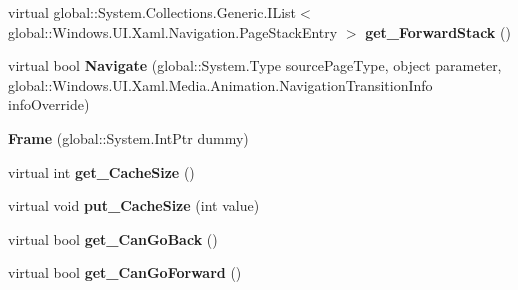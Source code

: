 \begin{DoxyCompactItemize}
\item 
\mbox{\label{class_windows_1_1_u_i_1_1_xaml_1_1_controls_1_1_frame_ae329d75ad7803db9b56a1087833db051}} 
virtual global\+::\+System.\+Collections.\+Generic.\+I\+List$<$ global\+::\+Windows.\+U\+I.\+Xaml.\+Navigation.\+Page\+Stack\+Entry $>$ {\bfseries get\+\_\+\+Forward\+Stack} ()
\item 
\mbox{\label{class_windows_1_1_u_i_1_1_xaml_1_1_controls_1_1_frame_ad618ba9d883d20cb4fe2b759803359e9}} 
virtual bool {\bfseries Navigate} (global\+::\+System.\+Type source\+Page\+Type, object parameter, global\+::\+Windows.\+U\+I.\+Xaml.\+Media.\+Animation.\+Navigation\+Transition\+Info info\+Override)
\item 
\mbox{\label{class_windows_1_1_u_i_1_1_xaml_1_1_controls_1_1_frame_a84fab9df3b200274d2539149011dfb10}} 
{\bfseries Frame} (global\+::\+System.\+Int\+Ptr dummy)
\item 
\mbox{\label{class_windows_1_1_u_i_1_1_xaml_1_1_controls_1_1_frame_a4feacaac243c53e320ffcf6ceba4a5e7}} 
virtual int {\bfseries get\+\_\+\+Cache\+Size} ()
\item 
\mbox{\label{class_windows_1_1_u_i_1_1_xaml_1_1_controls_1_1_frame_af1e1e012518d0402becbf9239646174d}} 
virtual void {\bfseries put\+\_\+\+Cache\+Size} (int value)
\item 
\mbox{\label{class_windows_1_1_u_i_1_1_xaml_1_1_controls_1_1_frame_ab2b52e19abf5dd97c35d8e4da92c57db}} 
virtual bool {\bfseries get\+\_\+\+Can\+Go\+Back} ()
\item 
\mbox{\label{class_windows_1_1_u_i_1_1_xaml_1_1_controls_1_1_frame_a85c6c5e01ec4c931d0b6f7752ea62bc4}} 
virtual bool {\bfseries get\+\_\+\+Can\+Go\+Forward} ()
\item 
\mbox{\label{class_windows_1_1_u_i_1_1_xaml_1_1_controls_1_1_frame_ac2a0cbed74e7e3a18163cbcb7a34def2}} 

\end{DoxyCompactItemize}
